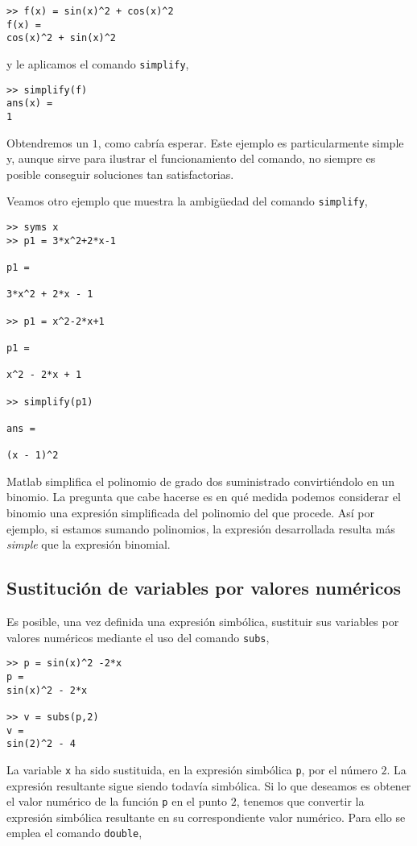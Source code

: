 \begin{verbatim}
>> f(x) = sin(x)^2 + cos(x)^2 
f(x) = 
cos(x)^2 + sin(x)^2
\end{verbatim} 

y le aplicamos el comando \texttt{simplify},
\begin{verbatim}
>> simplify(f)
ans(x) =
1
\end{verbatim}
Obtendremos un $1$, como cabría esperar. Este ejemplo es particularmente simple y, aunque sirve para ilustrar el funcionamiento del comando, no siempre es posible conseguir soluciones tan satisfactorias.

Veamos otro ejemplo que muestra la ambigüedad del comando \texttt{simplify},

\begin{verbatim}
>> syms x
>> p1 = 3*x^2+2*x-1
 
p1 =
 
3*x^2 + 2*x - 1
 
>> p1 = x^2-2*x+1
 
p1 =
 
x^2 - 2*x + 1
 
>> simplify(p1)
 
ans =
 
(x - 1)^2
\end{verbatim}

Matlab simplifica el polinomio de grado dos suministrado convirtiéndolo en un binomio. La pregunta que cabe hacerse es en qué medida podemos considerar el binomio una expresión simplificada del polinomio del que procede. Así por ejemplo, si estamos sumando polinomios, la expresión desarrollada resulta más \emph{simple} que la expresión binomial.

\subsection{Sustitución de variables por valores numéricos}
Es posible, una vez definida una expresión simbólica, sustituir sus variables por valores numéricos mediante el uso del comando \texttt{subs},

\begin{verbatim}
>> p = sin(x)^2 -2*x 
p = 
sin(x)^2 - 2*x
 
>> v = subs(p,2) 
v = 
sin(2)^2 - 4
\end{verbatim}

La variable \texttt{x} ha sido sustituida, en la expresión simbólica \texttt{p}, por el número $2$. La expresión resultante sigue siendo todavía simbólica.
Si lo que deseamos es obtener el valor numérico  de la función \texttt{p} en el punto $2$, tenemos que convertir la expresión simbólica resultante en su correspondiente valor numérico. Para ello se emplea el comando \texttt{double},


